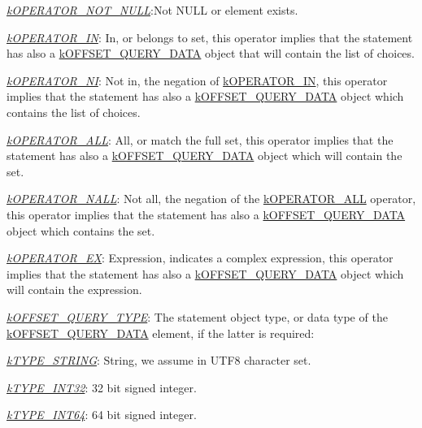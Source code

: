 {\begin{DoxyItemize}
\begin{DoxyItemize}
\item {\itshape \hyperlink{}{k\-O\-P\-E\-R\-A\-T\-O\-R\-\_\-\-N\-O\-T\-\_\-\-N\-U\-L\-L}}\-:Not {\ttfamily N\-U\-L\-L} or element exists. 
\item {\itshape \hyperlink{}{k\-O\-P\-E\-R\-A\-T\-O\-R\-\_\-\-I\-N}}\-: In, or belongs to set, this operator implies that the statement has also a \hyperlink{}{k\-O\-F\-F\-S\-E\-T\-\_\-\-Q\-U\-E\-R\-Y\-\_\-\-D\-A\-T\-A} object that will contain the list of choices. 
\item {\itshape \hyperlink{}{k\-O\-P\-E\-R\-A\-T\-O\-R\-\_\-\-N\-I}}\-: Not in, the negation of \hyperlink{}{k\-O\-P\-E\-R\-A\-T\-O\-R\-\_\-\-I\-N}, this operator implies that the statement has also a \hyperlink{}{k\-O\-F\-F\-S\-E\-T\-\_\-\-Q\-U\-E\-R\-Y\-\_\-\-D\-A\-T\-A} object which contains the list of choices. 
\item {\itshape \hyperlink{}{k\-O\-P\-E\-R\-A\-T\-O\-R\-\_\-\-A\-L\-L}}\-: All, or match the full set, this operator implies that the statement has also a \hyperlink{}{k\-O\-F\-F\-S\-E\-T\-\_\-\-Q\-U\-E\-R\-Y\-\_\-\-D\-A\-T\-A} object which will contain the set. 
\item {\itshape \hyperlink{}{k\-O\-P\-E\-R\-A\-T\-O\-R\-\_\-\-N\-A\-L\-L}}\-: Not all, the negation of the \hyperlink{}{k\-O\-P\-E\-R\-A\-T\-O\-R\-\_\-\-A\-L\-L} operator, this operator implies that the statement has also a \hyperlink{}{k\-O\-F\-F\-S\-E\-T\-\_\-\-Q\-U\-E\-R\-Y\-\_\-\-D\-A\-T\-A} object which contains the set. 
\item {\itshape \hyperlink{}{k\-O\-P\-E\-R\-A\-T\-O\-R\-\_\-\-E\-X}}\-: Expression, indicates a complex expression, this operator implies that the statement has also a \hyperlink{}{k\-O\-F\-F\-S\-E\-T\-\_\-\-Q\-U\-E\-R\-Y\-\_\-\-D\-A\-T\-A} object which will contain the expression. 
\end{DoxyItemize}
\item {\itshape \hyperlink{}{k\-O\-F\-F\-S\-E\-T\-\_\-\-Q\-U\-E\-R\-Y\-\_\-\-T\-Y\-P\-E}}\-: The statement object type, or data type of the \hyperlink{}{k\-O\-F\-F\-S\-E\-T\-\_\-\-Q\-U\-E\-R\-Y\-\_\-\-D\-A\-T\-A} element, if the latter is required\-: 
\begin{DoxyItemize}
\item {\itshape \hyperlink{}{k\-T\-Y\-P\-E\-\_\-\-S\-T\-R\-I\-N\-G}}\-: String, we assume in U\-T\-F8 character set. 
\item {\itshape \hyperlink{}{k\-T\-Y\-P\-E\-\_\-\-I\-N\-T32}}\-: 32 bit signed integer. 
\item {\itshape \hyperlink{}{k\-T\-Y\-P\-E\-\_\-\-I\-N\-T64}}\-: 64 bit signed integer. 

\end{DoxyItemize}
\end{DoxyItemize}}
